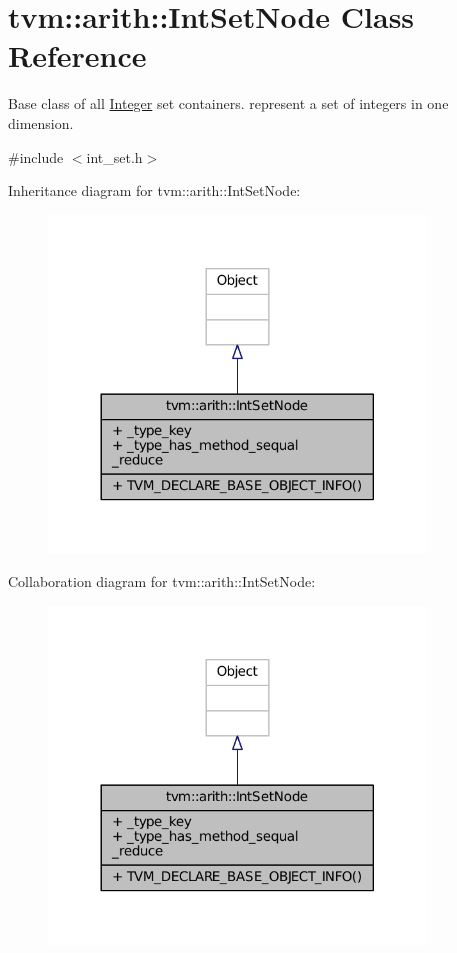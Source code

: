 \hypertarget{classtvm_1_1arith_1_1IntSetNode}{}\section{tvm\+:\+:arith\+:\+:Int\+Set\+Node Class Reference}
\label{classtvm_1_1arith_1_1IntSetNode}


Base class of all \hyperlink{classtvm_1_1Integer}{Integer} set containers. represent a set of integers in one dimension.  




{\ttfamily \#include $<$int\+\_\+set.\+h$>$}



Inheritance diagram for tvm\+:\+:arith\+:\+:Int\+Set\+Node\+:
\nopagebreak
\begin{figure}[H]
\begin{center}
\leavevmode
\includegraphics[width=284pt]{classtvm_1_1arith_1_1IntSetNode__inherit__graph}
\end{center}
\end{figure}


Collaboration diagram for tvm\+:\+:arith\+:\+:Int\+Set\+Node\+:
\nopagebreak
\begin{figure}[H]
\begin{center}
\leavevmode
\includegraphics[width=284pt]{classtvm_1_1arith_1_1IntSetNode__coll__graph}
\end{center}
\end{figure}
